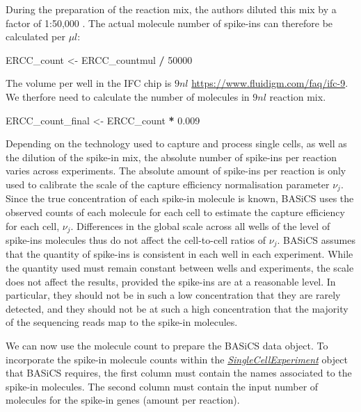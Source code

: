 \documentclass[9pt,a4paper,]{extarticle}
\newenvironment{Shaded}{\begin{snugshade}}{\end{snugshade}}
\newcommand{\DecValTok}[1]{\textcolor[rgb]{0.00,0.00,0.81}{#1}}
\newcommand{\FloatTok}[1]{\textcolor[rgb]{0.00,0.00,0.81}{#1}}
\newcommand{\NormalTok}[1]{#1}
\newcommand{\OperatorTok}[1]{\textcolor[rgb]{0.81,0.36,0.00}{\textbf{#1}}}
\newcommand{\StringTok}[1]{\textcolor[rgb]{0.31,0.60,0.02}{#1}}
\begin{document}
During the preparation of the reaction mix, the authors diluted this mix by a
factor of 1:50,000 \citep{Martinez-jimenez2017}.
The actual molecule number of spike-ins can therefore be calculated per \(\mu{}l\):

\begin{Shaded}
\begin{Highlighting}[]
\NormalTok{ERCC_count <-}\StringTok{ }\NormalTok{ERCC_countmul }\OperatorTok{/}\StringTok{ }\DecValTok{50000}
\end{Highlighting}
\end{Shaded}

The volume per well in the IFC chip is \(9nl\)
\url{https://www.fluidigm.com/faq/ifc-9}.
We therfore need to calculate the number of molecules in \(9nl\) reaction mix.

\begin{Shaded}
\begin{Highlighting}[]
\NormalTok{ERCC_count_final <-}\StringTok{ }\NormalTok{ERCC_count }\OperatorTok{*}\StringTok{ }\FloatTok{0.009}
\end{Highlighting}
\end{Shaded}

Depending on the technology used to capture and process single cells, as well
as the dilution of the spike-in mix, the absolute number of spike-ins per
reaction varies across experiments.
The absolute amount of spike-ins per reaction is only used
to calibrate the scale of the capture efficiency normalisation parameter
\(\nu_j\). Since the true concentration of each spike-in molecule is known,
BASiCS uses the observed counts of each molecule for each cell to estimate the
capture efficiency for each cell, \(\nu_j\). Differences in the
global scale across all wells of the level of spike-ins molecules thus do not
affect the cell-to-cell ratios of \(\nu_j\).
BASiCS assumes that the quantity of spike-ins is consistent in each well in
each experiment. While the quantity used must remain constant between wells and
experiments, the scale does not affect the results, provided the spike-ins
are at a reasonable level. In particular, they should not be in such a low
concentration that they are rarely detected, and they should not be at such
a high concentration that the majority of the sequencing reads map to the
spike-in molecules.

We can now use the molecule count to prepare the BASiCS data object.
To incorporate the spike-in molecule counts within the
\emph{\href{https://bioconductor.org/packages/3.11/SingleCellExperiment}{SingleCellExperiment}} object that BASiCS requires, the first
column must contain the names associated to the spike-in molecules.
The second column must contain the input number of molecules for the spike-in
genes (amount per reaction).
\end{document}
